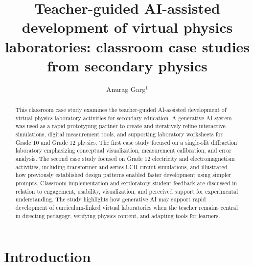\documentclass{iopjournal}
\begin{document}

\title{Teacher-guided AI-assisted development of virtual physics laboratories: classroom case studies from secondary physics}

\author{Anurag Garg$^1$}





\begin{abstract}
This classroom case study examines the teacher-guided AI-assisted development of virtual physics laboratory activities for secondary education. A generative AI system was used as a rapid prototyping partner to create and iteratively refine interactive simulations, digital measurement tools, and supporting laboratory worksheets for Grade 10 and Grade 12 physics. The first case study focused on a single-slit diffraction laboratory emphasizing conceptual visualization, measurement calibration, and error analysis. The second case study focused on Grade 12 electricity and electromagnetism activities, including transformer and series LCR circuit simulations, and illustrated how previously established design patterns enabled faster development using simpler prompts. Classroom implementation and exploratory student feedback are discussed in relation to engagement, usability, visualization, and perceived support for experimental understanding. The study highlights how generative AI may support rapid development of curriculum-linked virtual laboratories when the teacher remains central in directing pedagogy, verifying physics content, and adapting tools for learners.
\end{abstract}

\section{Introduction}
\end{document}
